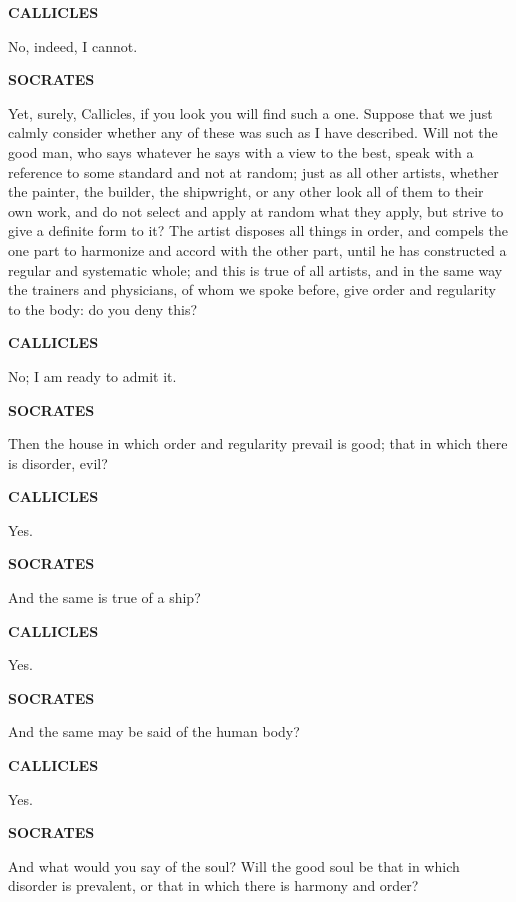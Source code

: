 \documentclass[11pt,letter]{article}
\begin{document}
\par \textbf{CALLICLES}
\par   No, indeed, I cannot.

\par \textbf{SOCRATES}
\par   Yet, surely, Callicles, if you look you will find such a one. Suppose that we just calmly consider whether any of these was such as I have described. Will not the good man, who says whatever he says with a view to the best, speak with a reference to some standard and not at random; just as all other artists, whether the painter, the builder, the shipwright, or any other look all of them to their own work, and do not select and apply at random what they apply, but strive to give a definite form to it? The artist disposes all things in order, and compels the one part to harmonize and accord with the other part, until he has constructed a regular and systematic whole; and this is true of all artists, and in the same way the trainers and physicians, of whom we spoke before, give order and regularity to the body:  do you deny this?

\par \textbf{CALLICLES}
\par   No; I am ready to admit it.

\par \textbf{SOCRATES}
\par   Then the house in which order and regularity prevail is good; that in which there is disorder, evil?

\par \textbf{CALLICLES}
\par   Yes.

\par \textbf{SOCRATES}
\par   And the same is true of a ship?

\par \textbf{CALLICLES}
\par   Yes.

\par \textbf{SOCRATES}
\par   And the same may be said of the human body?

\par \textbf{CALLICLES}
\par   Yes.

\par \textbf{SOCRATES}
\par   And what would you say of the soul? Will the good soul be that in which disorder is prevalent, or that in which there is harmony and order?
\end{document}
